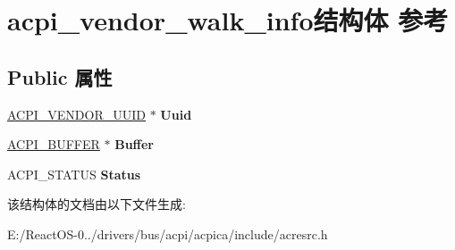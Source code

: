 \hypertarget{structacpi__vendor__walk__info}{}\section{acpi\+\_\+vendor\+\_\+walk\+\_\+info结构体 参考}
\label{structacpi__vendor__walk__info}
\subsection*{Public 属性}
\begin{DoxyCompactItemize}
\item 
\mbox{\label{structacpi__vendor__walk__info_af098e88af42a714dd07d537febdcdf74}} 
\hyperlink{structacpi__vendor__uuid}{A\+C\+P\+I\+\_\+\+V\+E\+N\+D\+O\+R\+\_\+\+U\+U\+ID} $\ast$ {\bfseries Uuid}
\item 
\mbox{\label{structacpi__vendor__walk__info_a32ba14ecbc8e6ea61d2f12a29d5ecd37}} 
\hyperlink{structacpi__buffer}{A\+C\+P\+I\+\_\+\+B\+U\+F\+F\+ER} $\ast$ {\bfseries Buffer}
\item 
\mbox{\label{structacpi__vendor__walk__info_a4c332eb4b101b83dad00ad7fba978d0b}} 
A\+C\+P\+I\+\_\+\+S\+T\+A\+T\+US {\bfseries Status}
\end{DoxyCompactItemize}


该结构体的文档由以下文件生成\+:\begin{DoxyCompactItemize}
\item 
E\+:/\+React\+O\+S-\/0../drivers/bus/acpi/acpica/include/acresrc.\+h\end{DoxyCompactItemize}
